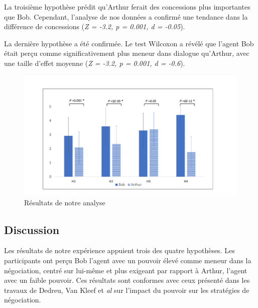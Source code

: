 \documentclass [french]{sig-alternate-05-2015}
\begin{document}
{				La troisième hypothèse prédit qu'Arthur ferait des concessions plus importantes que Bob. Cependant, l'analyse de nos données a confirmé une tendance dans la différence de concessions (\emph {Z = -3.2, p = 0.001, d = -0.05}).
				
				La dernière hypothèse a été confirmée. Le test Wilcoxon a révélé que l'agent Bob était perçu comme significativement plus meneur dans dialogue qu'Arthur, avec une taille d'effet moyenne (\emph {Z = -3.2, p = 0.001, d = -0.6}).
				
			
				\begin{figure}[t]
					\centering
					\includegraphics[width=\textwidth,height=0.3\textheight]{graphs/res.pdf}
					\caption{Résultats de notre analyse}
					\label{res}
				\end{figure}
			
			\subsection{Discussion}
			
			Les résultats de notre expérience appuient trois des quatre hypothèses. Les participants ont perçu Bob l'agent avec un pouvoir élevé comme meneur dans la négociation, centré sur lui-même et plus exigeant par rapport à Arthur, l'agent avec un faible pouvoir. Ces résultats sont conformes avec ceux présenté dans les travaux de Dedreu, Van Kleef et \emph{al} \cite {de1995impact, de2004influence, de2004influence} sur l'impact du pouvoir sur les stratégies de négociation.
			
}
\end{document}
